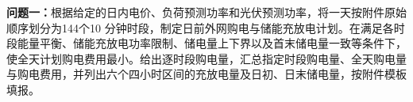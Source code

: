 \textbf{问题一：}根据给定的日内电价、负荷预测功率和光伏预测功率，将一天按附件原始顺序划分为144个10 分钟时段，制定日前外网购电与储能充放电计划。在满足各时段能量平衡、储能充放电功率限制、储电量上下界以及首末储电量一致等条件下，使全天计划购电费用最小。给出逐时段购电量，汇总指定时段购电量、全天购电量与购电费用，并列出六个四小时区间的充放电量及日初、日末储电量，按附件模板填报。
